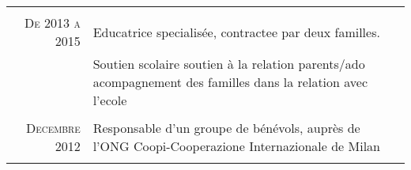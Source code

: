 \documentclass[a4paper,10pt]{article}
\begin{document}
\begin{tabular}{r|p{13cm}}
 \multicolumn{2}{c}{} \\
 \textsc{De 2013 a 2015} & Educatrice specialisée, contractee par deux familles.\\&
 \footnotesize{
 Soutien scolaire 
 soutien à la relation parents/ado
 acompagnement des familles dans la relation avec l'ecole
 }\\\multicolumn{2}{c}{} \\
\textsc{Decembre 2012} & Responsable d'un groupe de bénévols, auprès de l'ONG Coopi-Cooperazione
Internazionale de Milan\\&
\footnotesize{
}
\end{tabular}

\end{document}
